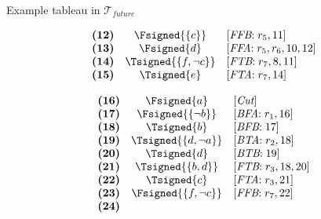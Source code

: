 \begin{frame}{Example tableau in $\mathcal{T}_{\textit{future}}$}
\begin{minipage}[t]{16cm}
\begin{minipage}[t]{6cm}
\[\begin{array}{lcl}
\textbf{(12)}                                      &
  \Fsigned{\{c\}}                                  &
  [\textit{FFB}{:}\;r_5, \text{11}]                \\
\textbf{(13)}                                      &
  \Fsigned{d}                                      &
  [\textit{FFA}{:}\;r_5,r_6, \text{10}, \text{12}] \\
\textbf{(14)}                                      &
  \Tsigned{\{f,\neg c\}}                   &
  [\textit{FTB}{:}\;r_7, \text{8}, \text{11}]      \\
\textbf{(15)}                                      &
  \Tsigned{e}                                      &
  [\textit{FTA}{:}\;r_7, \text{14}]
\end{array}
\]
\end{minipage}
%
\begin{minipage}[t]{6cm}
\[
\begin{array}{lcl}
\textbf{(16)}                                      &
  \Fsigned{a}                                      &
  [\textit{Cut}]                                   \\
\textbf{(17)}                                      &
  \Fsigned{\{\neg b\}}                     &
  [\textit{BFA}{:}\; r_1, \text{16}]               \\
\textbf{(18)}                                      &
  \Tsigned{b}                                      &
  [\textit{BFB}{:}\; \text{17}]                    \\
\textbf{(19)}                                      &
  \Tsigned{\{d,\neg a\}}                   &
  [\textit{BTA}{:}\;r_2, \text{18}]                \\
\textbf{(20)}                                      &
  \Tsigned{d}                                      &
  [\textit{BTB}{:}\;\text{19}]                     \\
\textbf{(21)}                                      &
  \Tsigned{\{b,d\}}                                &
  [\textit{FTB}{:}\;r_3, \text{18}, \text{20}]     \\
\textbf{(22)}                                      &
  \Tsigned{c}                                      &
  [\textit{FTA}{:}\;r_3, \text{21}]                \\
\textbf{(23)}                                      &
  \Fsigned{\{f,\neg c\}}                   &
  [\textit{FFB}{:}\;r_7, \text{22}]                \\
\textbf{(24)}                                      &

\end{array}\]
\end{minipage}
\end{minipage}
\end{frame}

